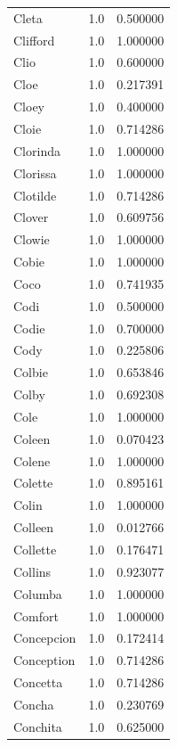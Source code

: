 \documentclass[
  letterpaper,
  DIV=11,
  numbers=noendperiod]{scrreprt}
\begin{document}
\begin{tabular}{lrr}
Cleta           &   1.0 &   0.500000 \\
Clifford        &   1.0 &   1.000000 \\
Clio            &   1.0 &   0.600000 \\
Cloe            &   1.0 &   0.217391 \\
Cloey           &   1.0 &   0.400000 \\
Cloie           &   1.0 &   0.714286 \\
Clorinda        &   1.0 &   1.000000 \\
Clorissa        &   1.0 &   1.000000 \\
Clotilde        &   1.0 &   0.714286 \\
Clover          &   1.0 &   0.609756 \\
Clowie          &   1.0 &   1.000000 \\
Cobie           &   1.0 &   1.000000 \\
Coco            &   1.0 &   0.741935 \\
Codi            &   1.0 &   0.500000 \\
Codie           &   1.0 &   0.700000 \\
Cody            &   1.0 &   0.225806 \\
Colbie          &   1.0 &   0.653846 \\
Colby           &   1.0 &   0.692308 \\
Cole            &   1.0 &   1.000000 \\
Coleen          &   1.0 &   0.070423 \\
Colene          &   1.0 &   1.000000 \\
Colette         &   1.0 &   0.895161 \\
Colin           &   1.0 &   1.000000 \\
Colleen         &   1.0 &   0.012766 \\
Collette        &   1.0 &   0.176471 \\
Collins         &   1.0 &   0.923077 \\
Columba         &   1.0 &   1.000000 \\
Comfort         &   1.0 &   1.000000 \\
Concepcion      &   1.0 &   0.172414 \\
Conception      &   1.0 &   0.714286 \\
Concetta        &   1.0 &   0.714286 \\
Concha          &   1.0 &   0.230769 \\
Conchita        &   1.0 &   0.625000 \\

\end{tabular}
\end{document}
